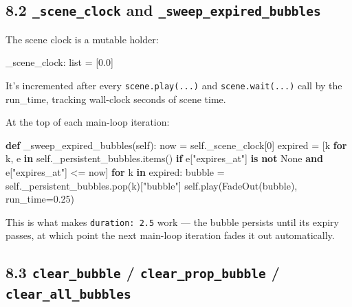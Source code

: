 \documentclass[
  11pt,
]{book}
\newenvironment{Shaded}{}{}
\newcommand{\BuiltInTok}[1]{\textcolor[rgb]{0.00,0.50,0.00}{#1}}
\newcommand{\ControlFlowTok}[1]{\textcolor[rgb]{0.00,0.44,0.13}{\textbf{#1}}}
\newcommand{\DecValTok}[1]{\textcolor[rgb]{0.25,0.63,0.44}{#1}}
\newcommand{\FloatTok}[1]{\textcolor[rgb]{0.25,0.63,0.44}{#1}}
\newcommand{\KeywordTok}[1]{\textcolor[rgb]{0.00,0.44,0.13}{\textbf{#1}}}
\newcommand{\NormalTok}[1]{#1}
\newcommand{\OperatorTok}[1]{\textcolor[rgb]{0.40,0.40,0.40}{#1}}
\newcommand{\StringTok}[1]{\textcolor[rgb]{0.25,0.44,0.63}{#1}}
\newcommand{\VariableTok}[1]{\textcolor[rgb]{0.10,0.09,0.49}{#1}}
\begin{document}
\subsection{\texorpdfstring{8.2 \texttt{\_scene\_clock} and
\texttt{\_sweep\_expired\_bubbles}}{8.2 \_scene\_clock and \_sweep\_expired\_bubbles}}\label{scene_clock-and-_sweep_expired_bubbles}

The scene clock is a mutable holder:

\begin{Shaded}
\begin{Highlighting}[]
\NormalTok{\_scene\_clock: }\BuiltInTok{list} \OperatorTok{=}\NormalTok{ [}\FloatTok{0.0}\NormalTok{]}
\end{Highlighting}
\end{Shaded}

It's incremented after every \texttt{scene.play(...)} and
\texttt{scene.wait(...)} call by the run\_time, tracking wall-clock
seconds of scene time.

At the top of each main-loop iteration:

\begin{Shaded}
\begin{Highlighting}[]
\KeywordTok{def}\NormalTok{ \_sweep\_expired\_bubbles(}\VariableTok{self}\NormalTok{):}
\NormalTok{    now }\OperatorTok{=} \VariableTok{self}\NormalTok{.\_scene\_clock[}\DecValTok{0}\NormalTok{]}
\NormalTok{    expired }\OperatorTok{=}\NormalTok{ [k }\ControlFlowTok{for}\NormalTok{ k, e }\KeywordTok{in} \VariableTok{self}\NormalTok{.\_persistent\_bubbles.items()}
               \ControlFlowTok{if}\NormalTok{ e[}\StringTok{"expires\_at"}\NormalTok{] }\KeywordTok{is} \KeywordTok{not} \VariableTok{None} \KeywordTok{and}\NormalTok{ e[}\StringTok{"expires\_at"}\NormalTok{] }\OperatorTok{\textless{}=}\NormalTok{ now]}
    \ControlFlowTok{for}\NormalTok{ k }\KeywordTok{in}\NormalTok{ expired:}
\NormalTok{        bubble }\OperatorTok{=} \VariableTok{self}\NormalTok{.\_persistent\_bubbles.pop(k)[}\StringTok{"bubble"}\NormalTok{]}
        \VariableTok{self}\NormalTok{.play(FadeOut(bubble), run\_time}\OperatorTok{=}\FloatTok{0.25}\NormalTok{)}
\end{Highlighting}
\end{Shaded}

This is what makes \texttt{duration:\ 2.5} work --- the bubble persists
until its expiry passes, at which point the next main-loop iteration
fades it out automatically.

\subsection{\texorpdfstring{8.3 \texttt{clear\_bubble} /
\texttt{clear\_prop\_bubble} /
\texttt{clear\_all\_bubbles}}{8.3 clear\_bubble / clear\_prop\_bubble / clear\_all\_bubbles}}\label{clear_bubble-clear_prop_bubble-clear_all_bubbles}
\end{document}
